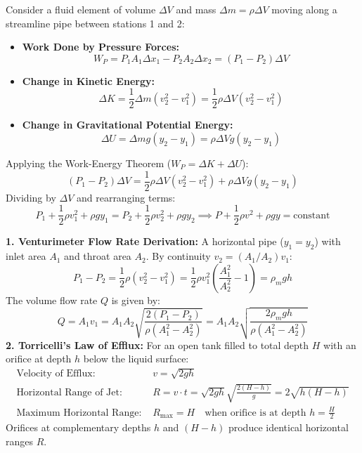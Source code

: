 \documentclass[10pt,twoside,openright]{book}
\begin{document}
\begin{formulabox}
Consider a fluid element of volume $\Delta V$ and mass $\Delta m = \rho\Delta V$ moving along a streamline pipe between stations 1 and 2:
\begin{itemize}[leftmargin=1.2em, itemsep=2pt]
  \item \textbf{Work Done by Pressure Forces:}
  \[
    W_P = P_1 A_1 \Delta x_1 - P_2 A_2 \Delta x_2 = (P_1 - P_2)\Delta V
  \]
  \item \textbf{Change in Kinetic Energy:}
  \[
    \Delta K = \frac{1}{2}\Delta m(v_2^2 - v_1^2) = \frac{1}{2}\rho\Delta V(v_2^2 - v_1^2)
  \]
  \item \textbf{Change in Gravitational Potential Energy:}
  \[
    \Delta U = \Delta m g(y_2 - y_1) = \rho\Delta V g(y_2 - y_1)
  \]
\end{itemize}
Applying the Work-Energy Theorem ($W_P = \Delta K + \Delta U$):
\begin{equation}
  (P_1 - P_2)\Delta V = \frac{1}{2}\rho\Delta V(v_2^2 - v_1^2) + \rho\Delta V g(y_2 - y_1)
\end{equation}
Dividing by $\Delta V$ and rearranging terms:
\begin{equation}
  P_1 + \frac{1}{2}\rho v_1^2 + \rho g y_1 = P_2 + \frac{1}{2}\rho v_2^2 + \rho g y_2 \implies P + \frac{1}{2}\rho v^2 + \rho g y = \text{constant}
\end{equation}
\end{formulabox}

\begin{formulabox}
\textbf{1. Venturimeter Flow Rate Derivation:}
A horizontal pipe ($y_1 = y_2$) with inlet area $A_1$ and throat area $A_2$. By continuity $v_2 = (A_1/A_2)v_1$:
\begin{equation}
  P_1 - P_2 = \frac{1}{2}\rho(v_2^2 - v_1^2) = \frac{1}{2}\rho v_1^2\left(\frac{A_1^2}{A_2^2} - 1\right) = \rho_m g h
\end{equation}
The volume flow rate $Q$ is given by:
\begin{equation}
  Q = A_1 v_1 = A_1 A_2 \sqrt{\frac{2(P_1 - P_2)}{\rho(A_1^2 - A_2^2)}} = A_1 A_2 \sqrt{\frac{2\rho_m g h}{\rho(A_1^2 - A_2^2)}}
\end{equation}
\textbf{2. Torricelli's Law of Efflux:}
For an open tank filled to total depth $H$ with an orifice at depth $h$ below the liquid surface:
\begin{align}
  \text{Velocity of Efflux: } &v = \sqrt{2gh} \\
  \text{Horizontal Range of Jet: } &R = v \cdot t = \sqrt{2gh}\sqrt{\frac{2(H-h)}{g}} = 2\sqrt{h(H-h)} \\
  \text{Maximum Horizontal Range: } &R_{\max} = H \quad \text{when orifice is at depth } h = \frac{H}{2}
\end{align}
Orifices at complementary depths $h$ and $(H-h)$ produce identical horizontal ranges $R$.
\end{formulabox}
\end{document}
